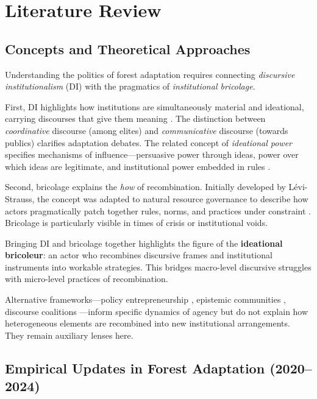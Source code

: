 
\section*{Literature Review}

\subsection*{Concepts and Theoretical Approaches}

Understanding the politics of forest adaptation requires connecting 
\emph{discursive institutionalism} (DI) with the pragmatics of \emph{institutional bricolage}.  

First, DI highlights how institutions are simultaneously material and ideational, 
carrying discourses that give them meaning \parencite{Schmidt2008}. The distinction 
between \textit{coordinative} discourse (among elites) and \textit{communicative} 
discourse (towards publics) clarifies adaptation debates. The related concept of 
\emph{ideational power} specifies mechanisms of influence—persuasive power through ideas, 
power over which ideas are legitimate, and institutional power embedded in rules 
\parencite{CarstensenSchmidt2016}.

Second, bricolage explains the \textit{how} of recombination. Initially developed by 
L\'{e}vi-Strauss, the concept was adapted to natural resource governance to describe 
how actors pragmatically patch together rules, norms, and practices under constraint 
\parencite{Cleaver2001,Carstensen2017}. Bricolage is particularly visible in times of 
crisis or institutional voids.

Bringing DI and bricolage together highlights the figure of the 
\textbf{ideational bricoleur}: an actor who recombines discursive frames and 
institutional instruments into workable strategies. This bridges macro-level 
discursive struggles with micro-level practices of recombination. 

Alternative frameworks—policy entrepreneurship \parencite{Kingdon1995}, epistemic 
communities \parencite{Haas1992}, discourse coalitions \parencite{Hajer1995}—inform 
specific dynamics of agency but do not explain how heterogeneous elements are 
recombined into new institutional arrangements. They remain auxiliary lenses here.

\subsection*{Empirical Updates in Forest Adaptation (2020--2024)}



